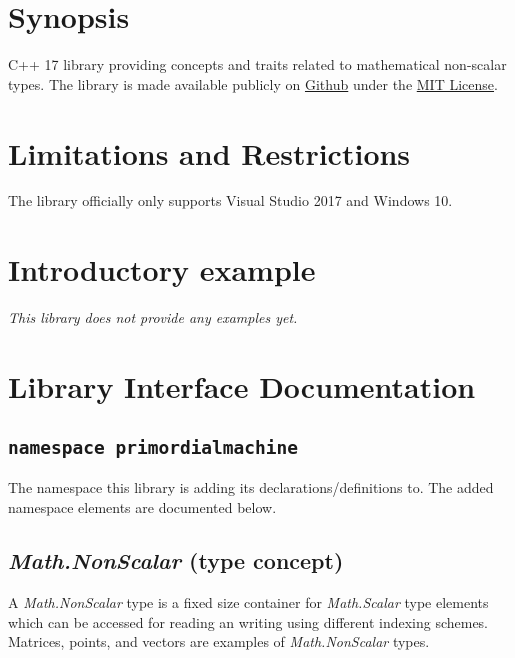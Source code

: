 \documentclass[oneside]{book}
\newcounter{example}[section]
\begin{document}
\frontmatter

\begin{titlepage}
\maketitle
\end{titlepage}

\tableofcontents
{}

\mainmatter

\chapter{Synopsis}
C++ 17 library providing concepts and traits related to mathematical non-scalar types.
The library is made available publicly on
\href{\GetLibraryRepository}{Github}
under the
\href{\GetLibraryRepository/blob/master/LICENSE}{MIT License}.

\chapter{Limitations and Restrictions}
The library officially only supports Visual Studio 2017 and Windows 10.

\chapter{Introductory example}
\textit{\color{orange}This library does not provide any examples yet.}



\chapter{Library Interface Documentation}

\section{\texttt{namespace primordialmachine}}
The namespace this library is adding its declarations/definitions to.
The added namespace elements are documented below.

\section{\textit{Math.NonScalar} (type concept)}
A \textit{Math.NonScalar} type is a fixed size container for   \textit{Math.Scalar}
type elements which can be accessed for reading an writing using different indexing
schemes. Matrices, points, and vectors are examples of      \textit{Math.NonScalar}
types. 
\end{document}
